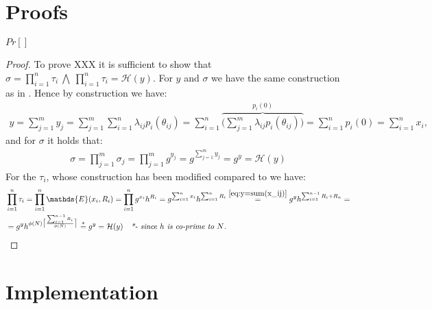 \section{Proofs}
\begin{thm}[Correctness]
$Pr[]$
\end{thm}
\begin{proof}
To prove XXX it is sufficient to show that $\sigma= \prod_{i=1}^n \tau_i \:\bigwedge\: \prod_{i=1}^n \tau_i = \mathcal{H}(y)$. For $y$ and $\sigma$ we have the same construction as in \cite{VHASS}. Hence by construction we have:
\begin{align}
    \label{eq:y=sum(x_ij)}
    y = \sum_{j=1}^m y_j= \sum_{j=1}^m \sum_{i=1}^n \lambda_{ij}p_i(\theta_{ij}) = \sum_{i=1}^n \overbrace{ \Big (\sum_{j=1}^m \lambda_{ij}p_i(\theta_{ij}) \Big)}^{ p_i(0)} = \sum_{i=1}^n p_i(0) = \sum_{i=1}^n x_i,
\end{align}
and for $\sigma$ it holds that:
\begin{align*}
    \sigma = \prod_{j=1}^m \sigma_j = \prod_{j=1}^m g^{y_j} = g^{\sum_{j=1}^my_j} =g^y = \mathcal{H}(y)
\end{align*}
For the $\tau_i$, whose construction has been modified compared to \cite{VHASS} we have:
\begin{align*}
    &\prod_{i=1}^n \tau_i = \prod_{i=1}^n \mathds{E}(x_i,R_i)= \prod_{i=1}^n g^{x_i}h^{R_i} = g^{\sum_{i=1}^n x_i } h^{\sum_{i=1}^n R_i} \overset{\eqref{eq:y=sum(x_ij)}}{=} g^y h^{\sum_{i=1}^{n-1} R_i+R_n} = \\ 
    &= g^y h^{ \phi(N)\big\lceil \frac{\sum_{i=1}^{n-1}R_i}{\phi(N) }\big\rceil}  \overset{*}{=} g^y = \mathcal{H}(y) \quad \textit{*- since $h$ is co-prime to $N$.}
\end{align*}

\end{proof}

\section{Implementation}